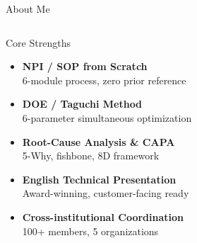\documentclass[aspectratio=169,10pt]{beamer}
\begin{document}
\begin{frame}{About Me}
\begin{columns}[T]
      \begin{block}{Core Strengths}
        \small
        \begin{itemize}
          \item \textbf{NPI / SOP from Scratch}\\
                {\footnotesize 6-module process, zero prior reference}
          \item \textbf{DOE / Taguchi Method}\\
                {\footnotesize 6-parameter simultaneous optimization}
          \item \textbf{Root-Cause Analysis \& CAPA}\\
                {\footnotesize 5-Why, fishbone, 8D framework}
          \item \textbf{English Technical Presentation}\\
                {\footnotesize Award-winning, customer-facing ready}
          \item \textbf{Cross-institutional Coordination}\\
                {\footnotesize 100+ members, 5 organizations}
        \end{itemize}
      \end{block}
  \end{columns}
\end{frame}

\end{document}
